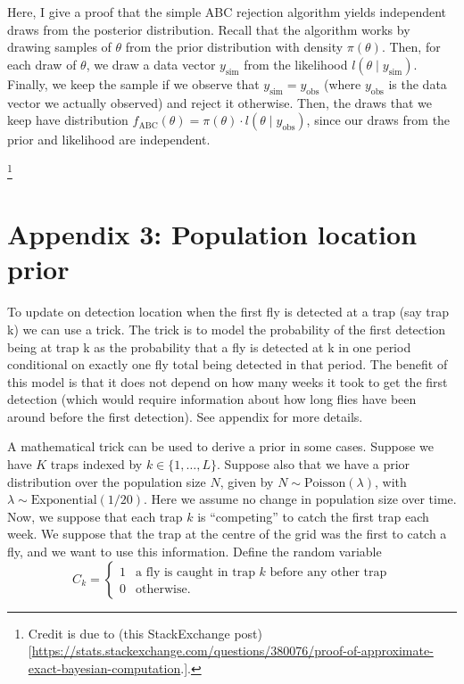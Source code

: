 \documentclass[
]{book}
\begin{document}
Here, I give a proof that the simple ABC rejection algorithm yields independent draws from the posterior distribution. Recall that the algorithm works by drawing samples of \(\theta\) from the prior distribution with density \(\pi (\theta)\). Then, for each draw of \(\theta\), we draw a data vector \(y_{\text {sim}}\) from the likelihood \(l(\theta \mid y_{\text{sim}})\). Finally, we keep the sample if we observe that \(y_{\text{sim}} = y_{\text{obs}}\) (where \(y_{\text{obs}}\) is the data vector we actually observed) and reject it otherwise. Then, the draws that we keep have distribution \(f_{\text{ABC}}(\theta) = \pi(\theta) \cdot l(\theta \mid y_{\text{obs}})\), since our draws from the prior and likelihood are independent.

\footnote{Credit is due to (this StackExchange post){[}\url{https://stats.stackexchange.com/questions/380076/proof-of-approximate-exact-bayesian-computation}.{]}.}

\hypertarget{appendix-3-population-location-prior-1}{%
\chapter{Appendix 3: Population location prior}\label{appendix-3-population-location-prior-1}}

To update on detection location when the first fly is detected at a trap (say trap k) we can use a trick. The trick is to model the probability of the first detection being at trap k as the probability that a fly is detected at k in one period conditional on exactly one fly total being detected in that period. The benefit of this model is that it does not depend on how many weeks it took to get the first detection (which would require information about how long flies have been around before the first detection). See appendix for more details.

A mathematical trick can be used to derive a prior in some cases. Suppose we have \(K\) traps indexed by \(k \in \{1, \ldots, L\}\). Suppose also that we have a prior distribution over the population size \(N\), given by \(N \sim \mathrm{Poisson} (\lambda)\), with \(\lambda \sim \mathrm{Exponential(1/20)}\). Here we assume no change in population size over time. Now, we suppose that each trap \(k\) is ``competing'' to catch the first trap each week. We suppose that the trap at the centre of the grid was the first to catch a fly, and we want to use this information. Define the random variable
\[
C_k = \begin{cases}1 & \text{a fly is caught in trap } k \text{ before any other trap} \\ 0 & \text{otherwise}. \end{cases}
\]
\end{document}
